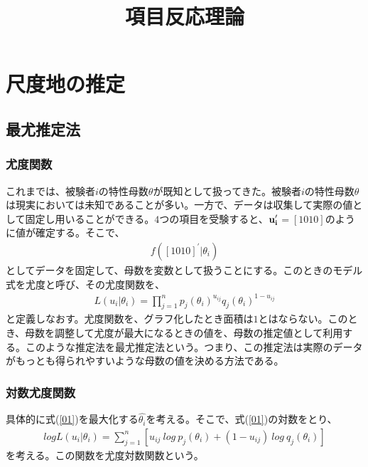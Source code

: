 \documentclass[12pt]{jarticle}
\title{項目反応理論}
\begin{document}
\maketitle
\section{尺度地の推定}
\subsection{最尤推定法}
\subsubsection{尤度関数}
これまでは、被験者$i$の特性母数$\theta$が既知として扱ってきた。被験者$i$の特性母数$\theta$は現実においては未知であることが多い。一方で、データは収集して実際の値として固定し用いることができる。$4$つの項目を受験すると、$\displaystyle \bf u_i^{\prime}$$=[1010]$のように値が確定する。そこで、
\begin{eqnarray}
  \label{00}
  \displaystyle f([1010]^{\prime}|\theta_i)
\end{eqnarray}
としてデータを固定して、母数を変数として扱うことにする。このときのモデル式を尤度と呼び、その尤度関数を、
\begin{eqnarray}
  \label{01}
  \displaystyle L(u_{i}|\theta_i) =\prod_{j = 1}^{n} p_{j}(\theta_i)^{u_{ij}} q_{j}(\theta_i)^{1 - u_{ij}}
\end{eqnarray}
と定義しなおす。尤度関数を、グラフ化したとき面積は$1$とはならない。このとき、母数を調整して尤度が最大になるときの値を、母数の推定値として利用する。このような推定法を最尤推定法という。つまり、この推定法は実際のデータがもっとも得られやすいような母数の値を決める方法である。
\subsubsection{対数尤度関数}
具体的に式(\ref{01})を最大化する$\hat{\theta_i}$を考える。そこで、式(\ref{01})の対数をとり、
\begin{eqnarray}
  \label{02}
  \displaystyle log L(u_{i}|\theta_i) =\sum_{j = 1}^{n} [u_{ij} \  log \  p_{j}(\theta_i) + (1 - u_{ij}) \ log \  q_{j}(\theta_i)]
\end{eqnarray}
を考える。この関数を尤度対数関数という。
\end{document}
